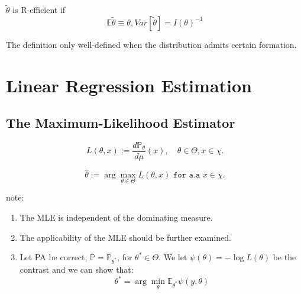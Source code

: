 \begin{definition}[R-efficiency]
	$\tilde{\theta}$ is R-efficient if
	\begin{equation*}
		\mathbb{E}\tilde{\theta} \equiv \theta, Var[\tilde{\theta}] = I(\theta)^{-1}
	\end{equation*} 

\end{definition}
The definition only well-defined when the distribution admits certain formation.






\newpage



\section{Linear Regression Estimation}
\subsection{The Maximum-Likelihood Estimator}
\begin{definition}
\begin{equation}
	L(\theta, x):= \frac{d\mathbb{P}_\theta}{d\mu}(x), \quad \theta \in \Theta, x \in \chi. 
\end{equation}	
\end{definition}

\begin{definition}
\begin{equation}
	\hat{\theta}  := \arg\max_{\theta \in \Theta} L(\theta, x) \texttt{ for a.a } x \in \chi. 
\end{equation}
\end{definition}

\begin{remark}
note:
\begin{enumerate}
    \item The MLE is independent of the dominating measure.
    \item The applicability of the MLE should be further examined.
    \item Let PA be correct, $\mathbb{P} = \mathbb{P}_{\theta^*}$, for $\theta^* \in \Theta$. We let $\psi(\theta) = -\log L(\theta)$ be the contrast and we can show that:
		\begin{equation*}
			\theta^* = \arg \min_\theta \mathbb{E}_{\theta^*} \psi(y, \theta) 
		\end{equation*}
\end{enumerate}
\end{remark}

